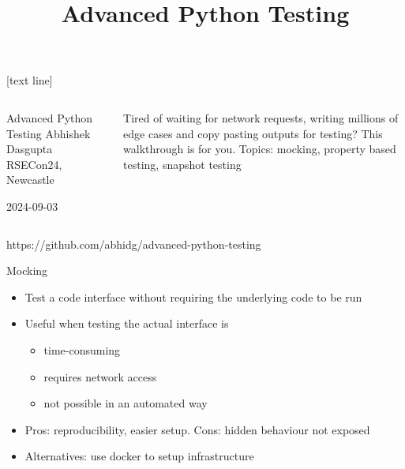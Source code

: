 \documentclass[11pt,xcolor={dvipsnames},hyperref={pdftex,pdfpagemode=UseNone,hidelinks,pdfdisplaydoctitle=true},usepdftitle=false]{beamer}
\begin{document}
\title{Advanced Python Testing}


{

    [text line]{}

\begin{frame}

  \begin{columns}
  \begin{column}{0.4\textwidth}
    {\LARGE Advanced Python Testing}
    \vskip 0.5cm
    Abhishek Dasgupta
    \vskip 2.5cm
    RSECon24, Newcastle

    2024-09-03
  \end{column}
  \begin{column}{0.4\textwidth}  %
    Tired of waiting for network requests, writing millions of edge cases
and copy pasting outputs for testing? This walkthrough is for you.
\vskip 0.5cm
Topics: mocking, property based testing, snapshot testing
  \end{column}
  \end{columns}
\vskip 1cm
    \phantom{aaa}\small{https://github.com/abhidg/advanced-python-testing}
  \end{frame}
}



\begin{frame}{Mocking}
\label{mocking}
\begin{itemize}
\item
  Test a code interface without requiring the underlying code to be run
\item
  Useful when testing the actual interface is

  \begin{itemize}
  \item
    time-consuming
  \item
    requires network access
  \item
    not possible in an automated way
  \end{itemize}
\item Pros: reproducibility, easier setup. Cons: hidden behaviour not exposed
\item Alternatives: use docker to setup infrastructure
\end{itemize}
\end{frame}
\end{document}
